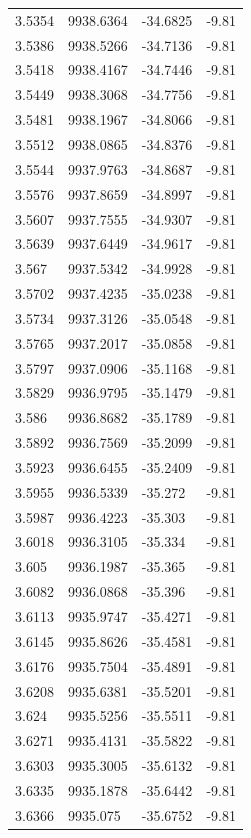 \begin{table}[H]
\begin{tabular}{llll}
3.5354 & 9938.6364 & -34.6825 & -9.81 \\
3.5386 & 9938.5266 & -34.7136 & -9.81 \\
3.5418 & 9938.4167 & -34.7446 & -9.81 \\
3.5449 & 9938.3068 & -34.7756 & -9.81 \\
3.5481 & 9938.1967 & -34.8066 & -9.81 \\
3.5512 & 9938.0865 & -34.8376 & -9.81 \\
3.5544 & 9937.9763 & -34.8687 & -9.81 \\
3.5576 & 9937.8659 & -34.8997 & -9.81 \\
3.5607 & 9937.7555 & -34.9307 & -9.81 \\
3.5639 & 9937.6449 & -34.9617 & -9.81 \\
3.567 & 9937.5342 & -34.9928 & -9.81 \\
3.5702 & 9937.4235 & -35.0238 & -9.81 \\
3.5734 & 9937.3126 & -35.0548 & -9.81 \\
3.5765 & 9937.2017 & -35.0858 & -9.81 \\
3.5797 & 9937.0906 & -35.1168 & -9.81 \\
3.5829 & 9936.9795 & -35.1479 & -9.81 \\
3.586 & 9936.8682 & -35.1789 & -9.81 \\
3.5892 & 9936.7569 & -35.2099 & -9.81 \\
3.5923 & 9936.6455 & -35.2409 & -9.81 \\
3.5955 & 9936.5339 & -35.272 & -9.81 \\
3.5987 & 9936.4223 & -35.303 & -9.81 \\
3.6018 & 9936.3105 & -35.334 & -9.81 \\
3.605 & 9936.1987 & -35.365 & -9.81 \\
3.6082 & 9936.0868 & -35.396 & -9.81 \\
3.6113 & 9935.9747 & -35.4271 & -9.81 \\
3.6145 & 9935.8626 & -35.4581 & -9.81 \\
3.6176 & 9935.7504 & -35.4891 & -9.81 \\
3.6208 & 9935.6381 & -35.5201 & -9.81 \\
3.624 & 9935.5256 & -35.5511 & -9.81 \\
3.6271 & 9935.4131 & -35.5822 & -9.81 \\
3.6303 & 9935.3005 & -35.6132 & -9.81 \\
3.6335 & 9935.1878 & -35.6442 & -9.81 \\
3.6366 & 9935.075 & -35.6752 & -9.81 \\

\end{tabular}
\end{table}
